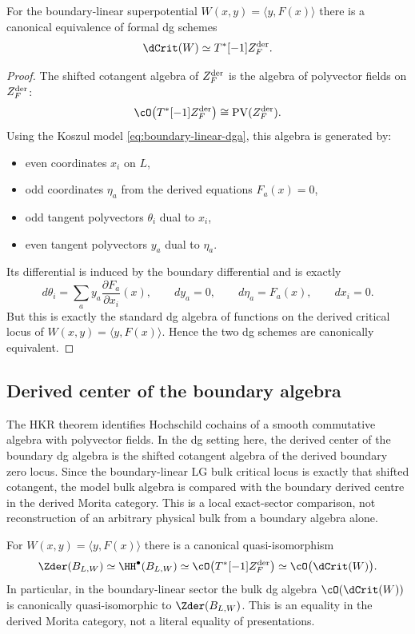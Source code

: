 \begin{theorem}\label{thm:dcrit-shiftedcot}
For the boundary-linear superpotential $W(x,y)=\langle y,F(x)\rangle$ there is a canonical equivalence of formal dg schemes
\[
\dCrit(W)\simeq T^*[-1] Z_F^{\der}.
\]
\end{theorem}

\begin{proof}
The shifted cotangent algebra of $Z_F^{\mathrm{der}}$ is the algebra of polyvector fields on $Z_F^{\mathrm{der}}$:
\[
\cO\bigl(T^*[-1]Z_F^{\der}\bigr)\cong \PV(Z_F^{\der}).
\]
Using the Koszul model \eqref{eq:boundary-linear-dga}, this algebra is generated by:
\begin{itemize}[leftmargin=1.8em]
\item even coordinates $x_i$ on $L$,
\item odd coordinates $\eta_a$ from the derived equations $F_a(x)=0$,
\item odd tangent polyvectors $\theta_i$ dual to $x_i$,
\item even tangent polyvectors $y_a$ dual to $\eta_a$.
\end{itemize}
Its differential is induced by the boundary differential and is exactly
\[
d\theta_i
=
\sum_a y_a\frac{\partial F_a}{\partial x_i}(x),
\qquad
dy_a=0,
\qquad
d\eta_a=F_a(x),
\qquad
dx_i=0.
\]
But this is exactly the standard dg algebra of functions on the derived critical locus of $W(x,y)=\langle y,F(x)\rangle$. Hence the two dg schemes are canonically equivalent.
\end{proof}

\subsection{Derived center of the boundary algebra}

The HKR theorem identifies Hochschild cochains of a smooth commutative
algebra with polyvector fields. In the dg setting here, the derived
center of the boundary dg algebra is the shifted cotangent algebra of
the derived boundary zero locus. Since the boundary-linear LG bulk
critical locus is exactly that shifted cotangent, the model bulk algebra
is compared with the boundary derived centre in the derived Morita
category. This is a local exact-sector comparison, not reconstruction
of an arbitrary physical bulk from a boundary algebra alone.

\begin{theorem}\label{thm:boundary-linear-bulk-boundary}
For $W(x,y)=\langle y,F(x)\rangle$ there is a canonical quasi-isomorphism
\[
\Zder(B_{L,W})
\simeq
\HH^\bullet(B_{L,W})
\simeq
\cO\bigl(T^*[-1]Z_F^{\der}\bigr)
\simeq
\cO\bigl(\dCrit(W)\bigr).
\]
In particular, in the boundary-linear sector the bulk dg algebra
\(\cO(\dCrit(W))\) is canonically quasi-isomorphic to
\(\Zder(B_{L,W})\).  This is an equality in the derived Morita
category, not a literal equality of presentations.
\end{theorem}

